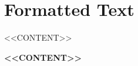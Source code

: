 \documentclass{article}
\begin{document}
\section*{Formatted Text}

\newcommand{\uppercaseformat}[1]{%
  \MakeUppercase{#1}%
}

\newcommand{\boldformat}[1]{%
  \textbf{#1}%
}

\uppercaseformat{<<CONTENT>>}

\boldformat{<<CONTENT>>}
\end{document}
